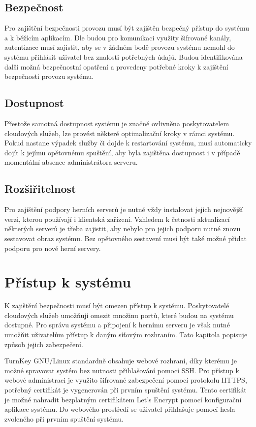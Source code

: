\subsection{Bezpečnost}

Pro zajištění bezpečnosti provozu musí být zajištěn bezpečný přístup do systému a k běžícím aplikacím. Dle \cite{securing_cloud} budou
pro komunikaci využity šifrované kanály, autentizace musí zajistit, aby se v žádném bodě provozu systému nemohl do systému přihlásit uživatel bez znalosti potřebných údajů.
Budou identifikována další možná bezpečnostní opatření a provedeny potřebné kroky k zajištění bezpečnosti provozu systému.

\subsection{Dostupnost}

Přestože samotná dostupnost systému je značně ovlivněna poskytovatelem cloudových služeb, lze provést některé optimalizační kroky v rámci systému.
Pokud nastane výpadek služby či dojde k restartování systému, musí automaticky dojít k jejímu opětovnému spuštění, aby byla zajištěna dostupnost i v případě
momentální absence administrátora serveru.

\subsection{Rozšiřitelnost}

Pro zajištění podpory herních serverů je nutné vždy instalovat jejich nejnovější verzi, kterou používají i klientská zařízení.
Vzhledem k četnosti aktualizací některých serverů je třeba zajistit, aby nebylo pro jejich podporu nutné znovu sestavovat obraz systému.
Bez opětovného sestavení musí být také možné přidat podporu pro nové herní servery. 

\section{Přístup k systému}

K zajištění bezpečnosti musí být omezen přístup k systému. Poskytovatelé cloudových služeb
umožňují omezit množinu portů, které budou na systému dostupné. Pro správu systému a připojení k hernímu
serveru je však nutné umožňit uživatelům přístup k daným síťovým rozhraním. Tato kapitola popisuje způsob jejich zabezpečení.

TurnKey GNU/Linux standardně obsahuje webové rozhraní,
díky kterému je možné spravovat systém bez nutnosti přihlašování pomocí SSH. Pro přístup k webové administraci
je využito šifrované zabezpečení pomocí protokolu HTTPS, potřebný certifikát je vygenerován při prvním spuštění systému.
Tento certifikát je možné nahradit bezplatným certifikátem Let's Encrypt \cite{lets_encrypt} pomocí konfigurační aplikace systému.
Do webového prostředí se uživatel přihlašuje pomocí hesla zvoleného při prvním spuštění systému. 

